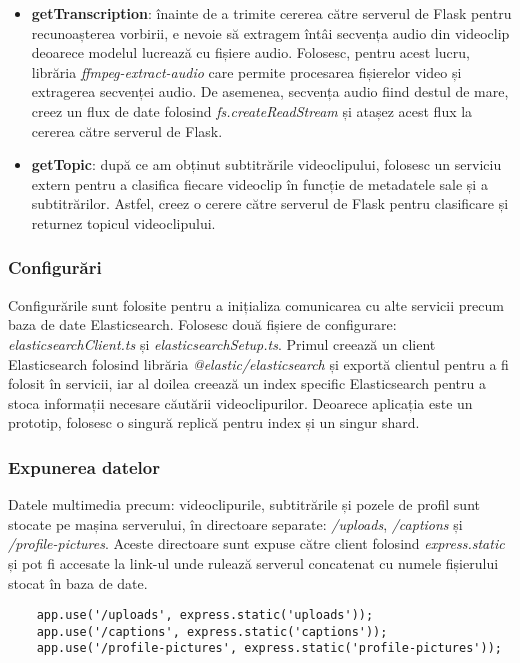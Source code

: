 \begin{itemize}
    \item \textbf{getTranscription}: înainte de a trimite cererea către serverul de Flask pentru 
    recunoașterea vorbirii, e nevoie să extragem întâi secvența audio din videoclip deoarece 
    modelul lucrează cu fișiere audio. Folosesc, pentru acest lucru, librăria \textit{ffmpeg-extract-audio}
    care permite procesarea fișierelor video și extragerea secvenței audio. De asemenea, secvența
    audio fiind destul de mare, creez un flux de date folosind \textit{fs.createReadStream} și 
    atașez acest flux la cererea către serverul de Flask.
    \item \textbf{getTopic}: după ce am obținut subtitrările videoclipului, folosesc un serviciu
    extern pentru a clasifica fiecare videoclip în funcție de metadatele sale și a subtitrărilor.
    Astfel, creez o cerere către serverul de Flask pentru clasificare și returnez topicul videoclipului.
\end{itemize}

\subsubsection{Configurări}
Configurările sunt folosite pentru a inițializa comunicarea cu alte servicii precum baza de date
Elasticsearch. Folosesc două fișiere de configurare: \textit{elasticsearchClient.ts} și
\textit{elasticsearchSetup.ts}. Primul creează un client Elasticsearch folosind librăria
\textit{@elastic/elasticsearch} și exportă clientul pentru a fi folosit în servicii, iar al doilea
creează un index specific Elasticsearch pentru a stoca informații necesare căutării videoclipurilor.
Deoarece aplicația este un prototip, folosesc o singură replică pentru index și un singur shard.

\subsubsection{Expunerea datelor}
Datele multimedia precum: videoclipurile, subtitrările și pozele de profil sunt stocate 
pe mașina serverului, în directoare separate: \textit{/uploads}, \textit{/captions} și
\textit{/profile-pictures}. Aceste directoare sunt expuse către client folosind
\textit{express.static} și pot fi accesate la link-ul unde rulează serverul concatenat
cu numele fișierului stocat în baza de date.


\begin{verbatim}
    app.use('/uploads', express.static('uploads'));
    app.use('/captions', express.static('captions'));
    app.use('/profile-pictures', express.static('profile-pictures'));
\end{verbatim}

